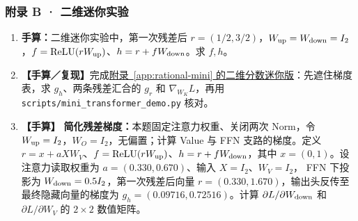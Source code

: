 \subsubsection*{附录 B · 二维迷你实验}
\begin{enumerate}[label={},leftmargin=4.8em,itemsep=4pt]
\item[\textbf{C-145.}] \leavevmode{}\label{exercise:C-145}\label{exercise:rational-mini-residual-warmup}\textbf{手算：}二维迷你实验中，第一次残差后 $r=(1/2,3/2)$，$W_{\rm up}=W_{\rm down}=I_2$，$f=\operatorname{ReLU}(rW_{\rm up})$、$h=r+fW_{\rm down}$。求 $f,h$。
\item[\textbf{C-146.}] \leavevmode{}\label{exercise:C-146}\label{exercise:rational-mini-gradient}\textbf{【手算／复现】}完成\hyperref[app:rational-mini]{附录~\ref*{app:rational-mini} 的二维分数迷你版}：先遮住梯度表，求 $g_h$、两条残差汇合的 $g_r$ 和 $\nabla_{W_K}L$，再用 \nolinkurl{scripts/mini_transformer_demo.py} 核对。
\item[\textbf{C-147.}] \leavevmode{}\label{exercise:C-147}\label{exercise:simplified-block-gradient}\textbf{【手算】} \textbf{简化残差梯度：}本题固定注意力权重、关闭两次 Norm，令 $W_{\rm up}=I_2$，$W_O=I_2$，无偏置；计算 Value 与 FFN 支路的梯度。定义 $r=x+aXW_V$、$f=\operatorname{ReLU}(rW_{\rm up})$、$h=r+fW_{\rm down}$，其中 $x=(0,1)$。设注意力读取权重为
$a=(0.330,0.670)$、输入 $X=I_2$、$W_V=I_2$，
FFN 下投影为 $W_{\rm down}=0.5I_2$，第一次残差后向量
$r=(0.330,1.670)$，输出头反传至最终隐藏向量的梯度为
$g_h=(0.09716,0.72516)$。计算
$\partial L/\partial W_{\rm down}$ 和
$\partial L/\partial W_V$ 的 $2\times2$ 数值矩阵。
\end{enumerate}
